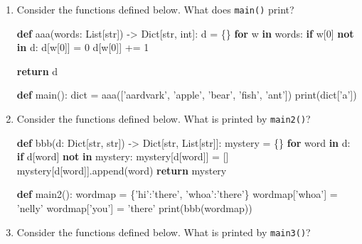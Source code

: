\documentclass[]{article}
\newenvironment{Shaded}{}{}
\newcommand{\KeywordTok}[1]{\textcolor[rgb]{0.00,0.44,0.13}{\textbf{#1}}}
\newcommand{\DecValTok}[1]{\textcolor[rgb]{0.25,0.63,0.44}{#1}}
\newcommand{\StringTok}[1]{\textcolor[rgb]{0.25,0.44,0.63}{#1}}
\newcommand{\ControlFlowTok}[1]{\textcolor[rgb]{0.00,0.44,0.13}{\textbf{#1}}}
\newcommand{\OperatorTok}[1]{\textcolor[rgb]{0.40,0.40,0.40}{#1}}
\newcommand{\BuiltInTok}[1]{#1}
\newcommand{\NormalTok}[1]{#1}
\begin{document}
\begin{enumerate}
\def\labelenumi{\arabic{enumi}.}
\item
  Consider the functions defined below. What does \texttt{main()} print?

\begin{Shaded}
\begin{Highlighting}[]
\KeywordTok{def}\NormalTok{ aaa(words: List[}\BuiltInTok{str}\NormalTok{]) }\OperatorTok{->}\NormalTok{ Dict[}\BuiltInTok{str}\NormalTok{, }\BuiltInTok{int}\NormalTok{]:}
\NormalTok{    d }\OperatorTok{=}\NormalTok{ \{\}}
    \ControlFlowTok{for}\NormalTok{ w }\KeywordTok{in}\NormalTok{ words:}
        \ControlFlowTok{if}\NormalTok{ w[}\DecValTok{0}\NormalTok{] }\KeywordTok{not} \KeywordTok{in}\NormalTok{ d:}
\NormalTok{            d[w[}\DecValTok{0}\NormalTok{]] }\OperatorTok{=} \DecValTok{0}
\NormalTok{        d[w[}\DecValTok{0}\NormalTok{]] }\OperatorTok{+=} \DecValTok{1}

    \ControlFlowTok{return}\NormalTok{ d}

\KeywordTok{def}\NormalTok{ main():}
    \BuiltInTok{dict} \OperatorTok{=}\NormalTok{ aaa([}\StringTok{'aardvark'}\NormalTok{, }\StringTok{'apple'}\NormalTok{, }\StringTok{'bear'}\NormalTok{, }\StringTok{'fish'}\NormalTok{, }\StringTok{'ant'}\NormalTok{])}
    \BuiltInTok{print}\NormalTok{(}\BuiltInTok{dict}\NormalTok{[}\StringTok{'a'}\NormalTok{])}
\end{Highlighting}
\end{Shaded}
\item
  Consider the functions defined below. What is printed by
  \texttt{main2()}?

\begin{Shaded}
\begin{Highlighting}[]
\KeywordTok{def}\NormalTok{ bbb(d: Dict[}\BuiltInTok{str}\NormalTok{, }\BuiltInTok{str}\NormalTok{]) }\OperatorTok{->}\NormalTok{ Dict[}\BuiltInTok{str}\NormalTok{, List[}\BuiltInTok{str}\NormalTok{]]:}
\NormalTok{    mystery }\OperatorTok{=}\NormalTok{ \{\}}
    \ControlFlowTok{for}\NormalTok{ word }\KeywordTok{in}\NormalTok{ d:}
        \ControlFlowTok{if}\NormalTok{ d[word] }\KeywordTok{not} \KeywordTok{in}\NormalTok{ mystery:}
\NormalTok{            mystery[d[word]] }\OperatorTok{=}\NormalTok{ []}
\NormalTok{        mystery[d[word]].append(word)}
    \ControlFlowTok{return}\NormalTok{ mystery}

\KeywordTok{def}\NormalTok{ main2():}
\NormalTok{    wordmap }\OperatorTok{=}\NormalTok{ \{}\StringTok{'hi'}\NormalTok{:}\StringTok{'there'}\NormalTok{, }\StringTok{'whoa'}\NormalTok{:}\StringTok{'there'}\NormalTok{\}}
\NormalTok{    wordmap[}\StringTok{'whoa'}\NormalTok{] }\OperatorTok{=} \StringTok{'nelly'}
\NormalTok{    wordmap[}\StringTok{'you'}\NormalTok{]  }\OperatorTok{=} \StringTok{'there'}
    \BuiltInTok{print}\NormalTok{(bbb(wordmap))}
\end{Highlighting}
\end{Shaded}
\item
  Consider the functions defined below. What is printed by
  \texttt{main3()}?


\end{enumerate}
\end{document}
